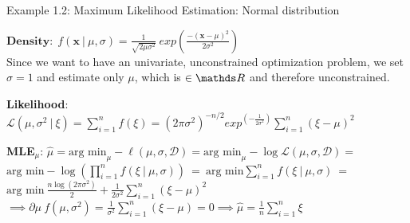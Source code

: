 \begin{vbframe}{Example 1.2: Maximum Likelihood Estimation: Normal distribution}

\begin{footnotesize}
$\textbf{Density:}~~f(\textbf{x} ~|~ \mu, \sigma) = \frac{1}{\sqrt{2 \mu \sigma^{2}}}~exp(\frac{-(\textbf{x}-\mu)^{2}}{2\sigma^{2}})$\\
\vspace{0.2cm}
Since we want to have an univariate, unconstrained optimization problem, we set $\sigma=1$ and estimate only $\mu$, which is $\in \R$ and therefore unconstrained.\\
\vspace{0.2cm}

\textbf{Likelihood}:~$\mathcal{L}(\mu, \sigma^{2}~|~\xi)= \sum_{i=1}^{n} f(\xi) = (2\pi \sigma^{2})^{-n/2}exp^{(-\frac{1}{2\sigma^{2}})} \sum_{i=1}^{n} (\xi-\mu)^{2} $\\
\vspace{0.2cm}

\textbf{MLE}$_{\mu}$: 
$\hat \mu = \text{arg min}_\mu -\ell(\mu, \sigma, \mathcal{D}) = \text{arg min}_\mu -\log \mathcal{L}(\mu, \sigma, \mathcal{D}) =$\\
\vspace{0.2cm}
$\text{arg min} -\log \left( \prod_{i=1}^{n} f(\xi ~|~ \mu, \sigma) \right) ~=~ \text{arg min} \sum_{i=1}^{n} f(\xi ~|~ \mu, \sigma) ~=~$\\
\vspace{0.2cm}
$\text{arg min} ~ \frac {n \log(2\pi\sigma^{2})}{2} + \frac{1}{2\sigma^{2}} \sum_{i=1}^{n} (\xi - \mu)^{2}$ \\
\vspace{0.2cm}
$\implies \partial \mu ~ f(\mu, \sigma^{2}) = \frac{1}{\sigma^{2}} \sum_{i=1}^{n} (\xi-\mu) = 0 \implies \hat \mu = \frac{1}{n} \sum_{i=1}^{n} \xi$



\end{footnotesize}






\end{vbframe}
